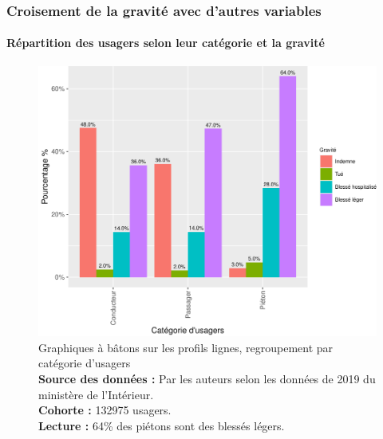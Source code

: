 \documentclass[french,]{tp}
\let\oldparagraph\paragraph
\renewcommand{\paragraph}[1]{\oldparagraph{#1}\mbox{}}
\begin{document}
\newpage

\hypertarget{croisement-de-la-gravituxe9-avec-dautres-variables}{%
\subsubsection{Croisement de la gravité avec d'autres variables}\label{croisement-de-la-gravituxe9-avec-dautres-variables}}

\hypertarget{ruxe9partition-des-usagers-selon-leur-catuxe9gorie-et-la-gravituxe9}{%
\paragraph{Répartition des usagers selon leur catégorie et la gravité}\label{ruxe9partition-des-usagers-selon-leur-catuxe9gorie-et-la-gravituxe9}}






\begin{figure}[ht!]

{\centering \includegraphics{Prediction_Gravite_files/figure-latex/barplotcatu-1} 

}

\caption{Graphiques à bâtons sur les profils lignes, regroupement par catégorie d'usagers\\
\textbf{Source des données :} Par les auteurs selon les données de 2019 du ministère de l'Intérieur.\\
\textbf{Cohorte :} 132975 usagers.\\
\textbf{Lecture :} 64\% des piétons sont des blessés légers.}\label{fig:barplotcatu}
\end{figure}
\end{document}
